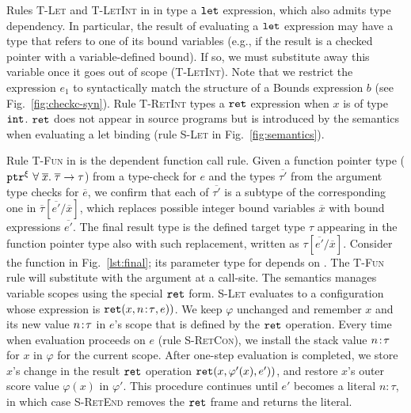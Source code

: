 {
%
Rules \textsc{T-Let} and \textsc{T-LetInt} in in  type a $\mathtt{let}$ expression, which also admits
type dependency. 
In particular, the result of evaluating a $\mathtt{let}$ expression
may have a type that refers to one of its bound variables (e.g., if
the result is a checked pointer with a variable-defined bound). 
If so, we must substitute away this variable once it goes out of scope (\textsc{T-LetInt}). 
Note that we restrict the expression $e_1$ to syntactically match the
structure of a Bounds expression $b$ (see Fig.~\ref{fig:checkc-syn}).
Rule \textsc{T-RetInt} types a $\mathtt{ret}$ expression when $x$ is of type $\mathtt{int}$.
$\mathtt{ret}$ does not appear in source programs but is introduced by the semantics when
evaluating a let binding (rule \textsc{S-Let} in
Fig.~\ref{fig:semantics}). 

Rule \textsc{T-Fun} in  is the dependent function call rule. 
Given a function pointer type ($\mathtt{ptr}^{\xi}~{\forall \;\overline{x}.\;{\overline{\tau}}\to\tau}$)
from a type-check for $e$ and the types $\overline{\tau'}$ from the argument type checks for $\overline{e}$,
we confirm that each of $\overline{\tau'}$ is
a subtype of the corresponding one in $\overline{\tau}[\overline{e'} / \overline{x}]$,
which replaces possible integer bound variables $\overline{x}$ with bound expressions $\overline{e'}$.
The final result type is the defined target type $\tau$ appearing in the function pointer type
also with such replacement, written as $\tau[\overline{e'} / \overline{x}]$.
Consider the  function in
Fig.~\ref{lst:final}; its parameter type for  
depends on . The \textsc{T-Fun} rule will substitute 
 with the argument at a call-site.
The semantics manages variable scopes using the special $\mathtt{ret}$
form. \textsc{S-Let} evaluates to a configuration whose expression is
$\mathtt{ret}({x},{{n}\!:\!{\tau}},{e}))$. We keep $\varphi$ unchanged
and remember $x$ and its new value ${n}\!:\!{\tau}$
in $e$'s scope that is defined by the $\mathtt{ret}$ operation.
Every time when evaluation proceeds on $e$ (rule \textsc{S-RetCon}),
we install the stack value ${n}\!:\!{\tau}$ for $x$ in $\varphi$ for the current scope.
After one-step evaluation is completed, 
we store $x$'s change in the result $\mathtt{ret}$ operation $\mathtt{ret}({x},{\varphi'(x)},{e'}))$,
and restore $x$'s outer score value $\varphi(x)$ in $\varphi'$. 
This procedure continues until $e'$ becomes a literal
$n\!:\!\tau$, in which case \textsc{S-RetEnd} removes the $\mathtt{ret}$ frame and returns
the literal. 

}
